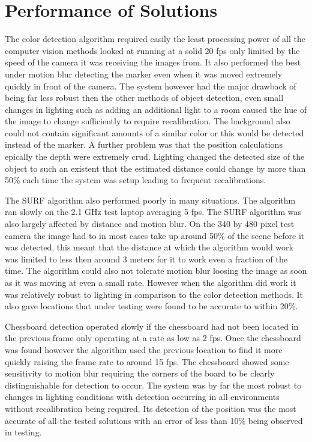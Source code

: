 \section{Performance of Solutions}
The color detection algorithm required easily the least processing power of all the computer vision methods looked at running at a solid 20 fps only limited by the speed of the camera it was receiving the images from. It also performed the best under motion blur  detecting the marker even when it was moved extremely quickly in front of the camera. The system however had the major drawback of being far less robust then the other methods of object detection, even small changes in lighting such as adding an additional light to a room caused the hue of the image to change sufficiently to require recalibration. The background also could not contain significant amounts of a similar color or this would be detected instead of the marker. A further problem was that the position calculations epically the depth were extremely crud. Lighting changed the detected size of the object to such an existent that the estimated distance could change by more than 50\% each time the system was setup leading to frequent recalibrations.

The SURF algorithm also performed poorly in many situations. The algorithm ran slowly on the 2.1 GHz test laptop averaging 5 fps. The SURF algorithm was also largely affected by distance and motion blur. On the 340 by 480 pixel test camera the image had to in most cases take up around 50\% of the scene before it was detected, this meant that the distance at which the algorithm would work was limited to less then around 3 meters for it to work even a fraction of the time. The algorithm could also not tolerate motion blur loosing the image as soon as it was moving at even a small rate. However when the algorithm did work it was relatively robust to lighting in comparison to the color detection methods. It also gave locations that under testing were found to be accurate to within 20\%.

Chessboard detection operated slowly if the chessboard had not been located in the previous frame only operating at a rate as low as 2 fps. Once the chessboard was found however the algorithm used the previous location to find it more quickly raising the frame rate to around 15 fps. The chessboard showed some sensitivity to motion blur requiring the corners of the board to be clearly distinguishable for detection to occur. The system was by far the most robust to changes in lighting conditions with detection occurring in all environments without recalibration being required. Its detection of the position was the most accurate of all the tested solutions with an error of less than 10\% being observed in testing.